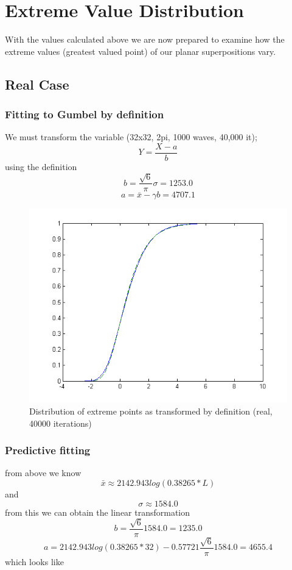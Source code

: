 \documentclass[12pt]{article}
\begin{document}
\section{Extreme Value Distribution}

With the values calculated above we are now prepared to examine how the extreme values (greatest valued point) of our planar superpositions vary.

\subsection{Real Case}

\subsubsection{Fitting to Gumbel by definition}
We must transform the variable (32x32, 2pi, 1000 waves, 40,000 it);
\[Y = \frac{X - a}{b}\]
using the definition
\[b = \frac{\sqrt{6}}{\pi} \sigma = 1253.0\]
\[a = \bar{x} - \gamma b = 4707.1\]

\begin{figure}[hpt]
	\centering
		\includegraphics[width=1.00\textwidth]{40000it32x32gumbR.png}
	\caption{Distribution of extreme points as transformed by definition (real, 40000 iterations)}
	\label{fig:40000it32x32gumbR}
\end{figure}

\subsubsection{Predictive fitting}
from above we know
\[\bar{x} \approx 2142.943 log(0.38265*L)\]
and
\[\sigma \approx 1584.0\]
from this we can obtain the linear transformation
\[b = \frac{\sqrt{6}}{\pi}1584.0 = 1235.0\]
\[a = 2142.943 log(0.38265*32) - 0.57721\frac{\sqrt{6}}{\pi}1584.0 = 4655.4\]
which looks like
\end{document}
